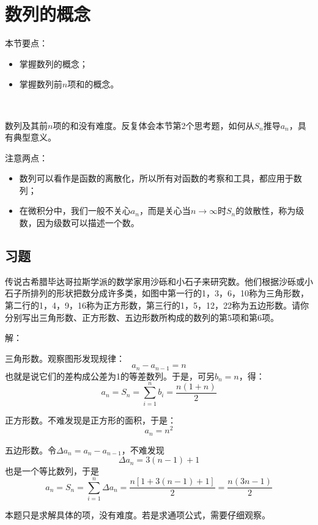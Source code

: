 \section{数列的概念}

本节要点：
\begin{itemize}
    \item 掌握数列的概念；
    \item 掌握数列前$n$项和的概念。
\end{itemize}

~

数列及其前$n$项的和没有难度。反复体会本节第2个思考题，如何从$S_n$推导$a_n$，具有典型意义。

注意两点：
\begin{itemize}
    \item 数列可以看作是函数的离散化，所以所有对函数的考察和工具，都应用于数列；
    \item 在微积分中，我们一般不关心$a_n$，而是关心当$n\rightarrow \infty $时$S_n$的敛散性，称为级数，因为级数可以描述一个数。
\end{itemize}

\subsection{习题}


\begin{example}
传说古希腊毕达哥拉斯学派的数学家用沙砾和小石子来研究数。他们根据沙砾或小石子所排列的形状把数分成许多类，如图中第一行的1，3，6，10称为三角形数，第二行的1，4，9，16称为正方形数，第三行的1，5，12，22称为五边形数。请你分别写出三角形数、正方形数、五边形数所构成的数列的第5项和第6项。
\end{example}

解：

三角形数。观察图形发现规律：
\[
a_n-a_{n-1}=n
\]
也就是说它们的差构成公差为1的等差数列。于是，可另$b_n=n$，得：
\[
a_n=S_n=\sum_{i=1}^n{b_i}=\frac{n\left( 1+n \right)}{2}
\]

正方形数。不难发现是正方形的面积，于是：
\[
a_n=n^2
\]

五边形数。令$\varDelta a_n=a_n-a_{n-1}$，不难发现
\[
\varDelta a_n=3\left( n-1 \right) +1
\]
也是一个等比数列，于是
\[
a_n=S_n=\sum_{i=1}^n{\varDelta a_n}=\frac{n\left[ 1+3\left( n-1 \right) +1 \right]}{2}=\frac{n\left( 3n-1 \right)}{2}
\]

\begin{tcolorbox}
本题只是求解具体的项，没有难度。若是求通项公式，需要仔细观察。
\end{tcolorbox}

